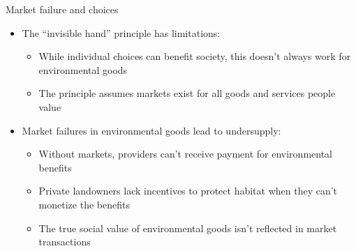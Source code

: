 \documentclass[
  ignorenonframetext,
]{beamer}
\providecommand{\tightlist}{%
  \setlength{\itemsep}{0pt}\setlength{\parskip}{0pt}}\usepackage{longtable,booktabs,array}
\begin{document}
\begin{frame}{Market failure and choices}
\label{market-failure-and-choices}
\begin{itemize}
\tightlist
\item
  The ``invisible hand'' principle has limitations:

  \begin{itemize}
  \tightlist
  \item
    While individual choices can benefit society, this doesn't always
    work for environmental goods
  \item
    The principle assumes markets exist for all goods and services
    people value
  \end{itemize}
\item
  Market failures in environmental goods lead to undersupply:

  \begin{itemize}
  \tightlist
  \item
    Without markets, providers can't receive payment for environmental
    benefits
  \item
    Private landowners lack incentives to protect habitat when they
    can't monetize the benefits
  \item
    The true social value of environmental goods isn't reflected in
    market transactions
  \end{itemize}
\end{itemize}
\end{frame}
\end{document}
